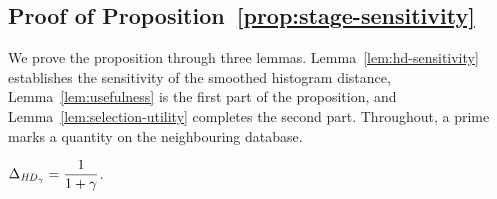 \subsection{Proof of Proposition~\ref{prop:stage-sensitivity}}
\label{app:proof-stage}

We prove the proposition through three lemmas.
Lemma~\ref{lem:hd-sensitivity} establishes the sensitivity of the smoothed histogram distance, Lemma~\ref{lem:usefulness} is the first part of the proposition, and Lemma~\ref{lem:selection-utility} completes the second part.
Throughout, a prime marks a quantity on the neighbouring database.

\begin{lemma}
\label{lem:hd-sensitivity}
$\Delta_{\mathit{HD}_\gamma}=\dfrac{1}{1+\gamma}$.
\end{lemma}

